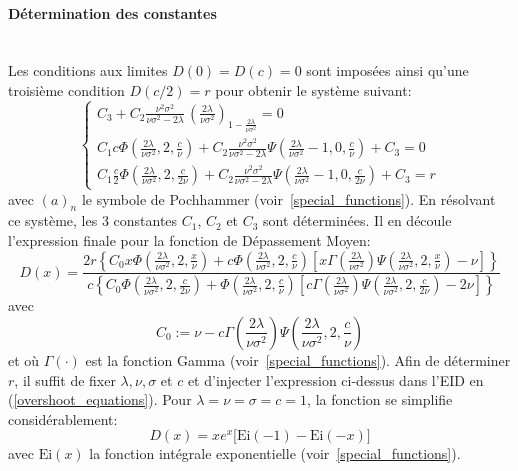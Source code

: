 \paragraph{Détermination des constantes}\phantom{}\\
Les conditions aux limites \(D(0)=D(c)=0\) sont imposées ainsi qu'une troisième condition \(D(c/2)=r\) pour obtenir le système suivant:
\[
\begin{cases}
    C_3+C_2\frac{ \nu^2\sigma^2  }{\nu  \sigma ^2-2 \lambda}\,{\left(\frac{2 \lambda }{\nu  \sigma ^2}\right)}_{1-\frac{2 \lambda }{\nu  \sigma ^2}}=0\\
    C_1c \Phi\left(\frac{2 \lambda }{\nu \sigma^2},2,\frac{c}{\nu }\right)+C_2 \frac{\nu^2\sigma^2}{\nu\sigma^2-2\lambda}\Psi\left(\frac{2 \lambda }{\nu \sigma^2}-1,0,\frac{c}{\nu }\right)+C_3=0\\
    C_1 \frac{c}{2} \Phi\left(\frac{2 \lambda }{\nu \sigma^2},2,\frac{c}{2\nu }\right)+C_2 \frac{\nu^2\sigma^2}{\nu\sigma^2-2\lambda}\Psi\left(\frac{2 \lambda }{\nu \sigma^2}-1,0,\frac{c}{2\nu }\right)+C_3=r
\end{cases}
\]
avec \({(a)}_n\) le symbole de Pochhammer (voir~\ref{special_functions}). En résolvant ce système, les 3 constantes $C_1$, $C_2$ et $C_3$ sont déterminées. Il en découle l'expression finale pour la fonction de Dépassement Moyen:
\begin{equation}\label{overshoot_exact_sol}
    D(x)=\frac{2 r \left\{C_0 x \Phi\left(\frac{2 \lambda }{\nu  \sigma ^2},2,\frac{x}{\nu }\right) +c \Phi\left(\frac{2 \lambda }{\nu  \sigma ^2},2,\frac{c}{\nu }\right) \left[x \Gamma \left(\frac{2 \lambda }{\nu  \sigma ^2}\right) \Psi\left(\frac{2 \lambda }{\nu  \sigma ^2},2,\frac{x}{\nu }\right)-\nu \right]\right\}}{c \left\{C_0\Phi\left(\frac{2 \lambda }{\nu  \sigma ^2},2,\frac{c}{2 \nu }\right)+\Phi\left(\frac{2 \lambda }{\nu  \sigma ^2},2,\frac{c}{\nu }\right) \left[c \Gamma \left(\frac{2 \lambda }{\nu  \sigma ^2}\right) \Psi\left(\frac{2 \lambda }{\nu  \sigma ^2},2,\frac{c}{2 \nu }\right)-2 \nu \right]\right\}}
\end{equation}
avec 
\[
C_0:=\nu -c \Gamma \left(\frac{2 \lambda }{\nu  \sigma ^2}\right) \Psi\left(\frac{2 \lambda }{\nu  \sigma ^2},2,\frac{c}{\nu }\right)
\]
et où \(\Gamma(\cdot)\) est la fonction Gamma (voir~\ref{special_functions}).
Afin de déterminer $r$, il suffit de fixer \(\lambda,\nu,\sigma\) et $c$ et d'injecter l'expression ci-dessus dans l'\acs{EID} en (\ref{overshoot_equations}). Pour \(\lambda=\nu=\sigma=c=1\), la fonction se simplifie considérablement:
\[
D(x)=xe^x\big[\text{Ei}(-1)-\text{Ei}(-x)\big]
\]
avec $\text{Ei}(x)$ la fonction intégrale exponentielle (voir~\ref{special_functions}).

